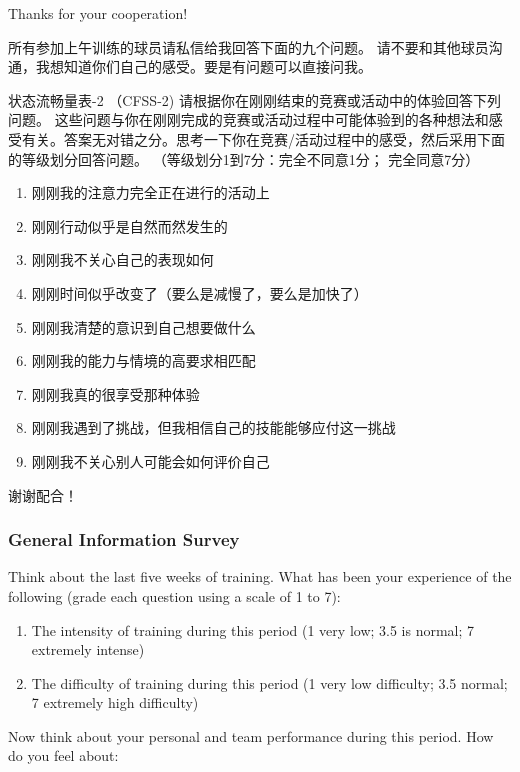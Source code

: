 \begin{CJK}{UTF8}{gbsn}
Thanks for your cooperation!




所有参加上午训练的球员请私信给我回答下面的九个问题。
请不要和其他球员沟通，我想知道你们自己的感受。要是有问题可以直接问我。


状态流畅量表-2 （CFSS-2)
请根据你在刚刚结束的竞赛或活动中的体验回答下列问题。 这些问题与你在刚刚完成的竞赛或活动过程中可能体验到的各种想法和感受有关。答案无对错之分。思考一下你在竞赛/活动过程中的感受，然后采用下面的等级划分回答问题。  （等级划分1到7分：完全不同意1分； 完全同意7分）

\begin{enumerate}
  \item 刚刚我的注意力完全正在进行的活动上
  \item 刚刚行动似乎是自然而然发生的
  \item 刚刚我不关心自己的表现如何
  \item 刚刚时间似乎改变了（要么是减慢了，要么是加快了）
  \item 刚刚我清楚的意识到自己想要做什么
  \item 刚刚我的能力与情境的高要求相匹配
  \item 刚刚我真的很享受那种体验
  \item 刚刚我遇到了挑战，但我相信自己的技能能够应付这一挑战
  \item 刚刚我不关心别人可能会如何评价自己
\end{enumerate}

  谢谢配合！





      \subsubsection{General Information Survey \label{sect:generalSurvey}}


Think about the last five weeks of training.  What has been your experience of the following (grade each question using a scale of 1 to 7):

\begin{enumerate}
\item The intensity of training during this period (1 very low; 3.5 is normal; 7 extremely intense)
\item The difficulty of training during this period (1 very low difficulty; 3.5 normal; 7 extremely high difficulty)
\end{enumerate}

Now think about your personal and team performance during this period.  How do you feel about:


\end{CJK}
